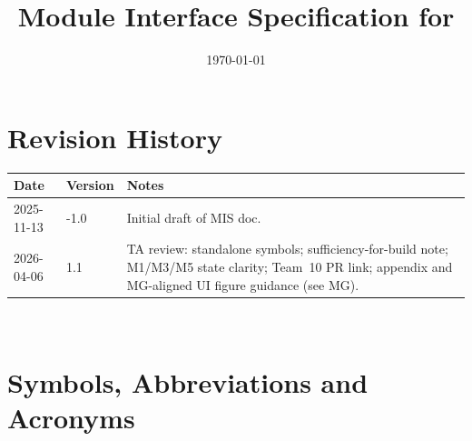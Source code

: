 \documentclass[12pt, titlepage]{article}
\begin{document}
\title{Module Interface Specification for \progname{}}

\author{\authname}

\date{\today}

\maketitle


\section{Revision History}

\begin{tabularx}{\textwidth}{p{3cm}p{2cm}X}
\toprule {\bf Date} & {\bf Version} & {\bf Notes}\\
\midrule
2025-11-13 & -1.0 & Initial draft of MIS doc. \\
2026-04-06 & 1.1 & TA review: standalone symbols; sufficiency-for-build note; M1/M3/M5 state clarity; Team~10 PR link; appendix and MG-aligned UI figure guidance (see MG). \\
\bottomrule
\end{tabularx}

~\newpage

\section{Symbols, Abbreviations and Acronyms}

\noindent
\end{document}
